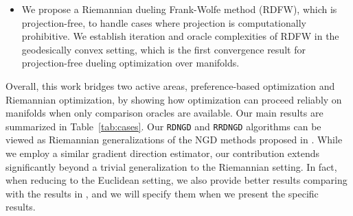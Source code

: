 \documentclass{article}
\theoremstyle{plain}
\theoremstyle{definition}
\theoremstyle{remark}
\begin{document}
\begin{itemize}[leftmargin=*]
    \item We propose a Riemannian dueling Frank-Wolfe method (RDFW), which is projection-free, to handle cases where projection is computationally prohibitive. %
    We establish iteration and oracle complexities of RDFW in the geodesically convex setting, which is the first convergence result for projection-free dueling optimization over manifolds.
\end{itemize}
Overall, this work bridges two active areas, preference-based optimization and Riemannian optimization, by showing how optimization can proceed reliably on manifolds when only comparison oracles are available. Our main results are summarized in Table~\ref{tab:cases}. 
Our \texttt{RDNGD} and \texttt{RRDNGD} algorithms can be viewed as Riemannian generalizations of the NGD methods proposed in \citep{pmlr-v139-saha21b}. While we employ a similar gradient direction estimator, our contribution extends significantly beyond a trivial generalization to the Riemannian setting. In fact, when reducing to the Euclidean setting, we also provide better results comparing with the results in \citep{pmlr-v139-saha21b}, and we will specify them when we present the specific results. %

\end{document}
